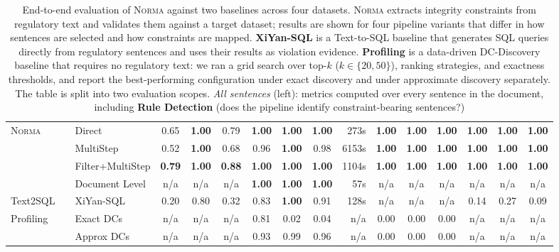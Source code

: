 \begin{table}[t]
\begin{tabular}{llcccccc@{\hspace{0.8em}}r@{\hspace{1.2em}}cccccc}
    \multirow{4}{*}{\textsc{Norma}} & ~~Direct & 0.65 & \textbf{1.00} & 0.79 & \textbf{1.00} & \textbf{1.00} & \textbf{1.00} & 273s & \textbf{1.00} & \textbf{1.00} & \textbf{1.00} & \textbf{1.00} & \textbf{1.00} & \textbf{1.00} \\
     & ~~MultiStep & 0.52 & \textbf{1.00} & 0.68 & 0.96 & \textbf{1.00} & 0.98 & 6153s & \textbf{1.00} & \textbf{1.00} & \textbf{1.00} & \textbf{1.00} & \textbf{1.00} & \textbf{1.00} \\
     & ~~Filter+MultiStep & \textbf{0.79} & \textbf{1.00} & \textbf{0.88} & \textbf{1.00} & \textbf{1.00} & \textbf{1.00} & 1104s & \textbf{1.00} & \textbf{1.00} & \textbf{1.00} & \textbf{1.00} & \textbf{1.00} & \textbf{1.00} \\
     & ~~Document Level & n/a & n/a & n/a & \textbf{1.00} & \textbf{1.00} & \textbf{1.00} & 57s & n/a & n/a & n/a & n/a & n/a & n/a \\
    \cmidrule(l){2-15}
    \multirow{1}{*}{Text2SQL} & ~~XiYan-SQL & 0.20 & 0.80 & 0.32 & 0.83 & \textbf{1.00} & 0.91 & 128s & n/a & n/a & n/a & 0.14 & 0.27 & 0.09 \\
    \cmidrule(l){2-15}
    \multirow{2}{*}{Profiling} & ~~Exact DCs & n/a & n/a & n/a & 0.81 & 0.02 & 0.04 & n/a & 0.00 & 0.00 & 0.00 & n/a & n/a & n/a \\
     & ~~Approx DCs & n/a & n/a & n/a & 0.93 & 0.99 & 0.96 & n/a & 0.00 & 0.00 & 0.00 & n/a & n/a & n/a \\
    \bottomrule
  \end{tabular}
  \caption{%
    End-to-end evaluation of \textsc{Norma} against two baselines across four datasets.
    \textsc{Norma} extracts integrity constraints from regulatory text and validates them
    against a target dataset; results are shown for four pipeline variants that differ in
    how sentences are selected and how constraints are mapped.
    \textbf{XiYan-SQL} is a Text-to-SQL baseline that generates SQL queries directly from
    regulatory sentences and uses their results as violation evidence.
    \textbf{Profiling} is a data-driven DC-Discovery baseline that requires no regulatory
    text: we ran a grid search over top-$k$ ($k \in \{20, 50\}$), ranking strategies, and
    exactness thresholds, and report the best-performing configuration under exact discovery
    and under approximate discovery separately.
    The table is split into two evaluation scopes.
    \textit{All sentences} (left): metrics computed over every sentence in the document,
    including \textbf{Rule Detection} (does the pipeline identify constraint-bearing sentences?)
}
\end{table}
